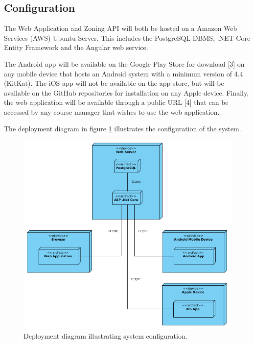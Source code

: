 \documentclass{article}
\begin{document}
    \subsection{Configuration}

    The Web Application and Zoning API will both be hosted on a Amazon Web
    Services (AWS) Ubuntu Server. This includes the PostgreSQL DBMS, .NET Core
    Entity Framework and the Angular web service.

    The Android app will be available on the Google Play Store for download
    [3] on any mobile device that hosts an Android system with a minimum
    version of 4.4 (KitKat). The iOS app will not be available on the app
    store, but will be available on the GitHub repositories for installation on
    any Apple device. Finally, the web application will be available through a
    public URL [4] that can be accessed by any course manager that wishes to
    use the web application.

    The deployment diagram in figure \ref{fig:depdia} illustrates the
    configuration of the system.

    \begin{center}
        \begin{figure}[H]
            \centering
            \includegraphics[scale=0.5]{DeploymentDiagram}
            \caption{Deployment diagram illustrating system configuration.}
            \label{fig:depdia}
        \end{figure}
    \end{center}
\end{document}
